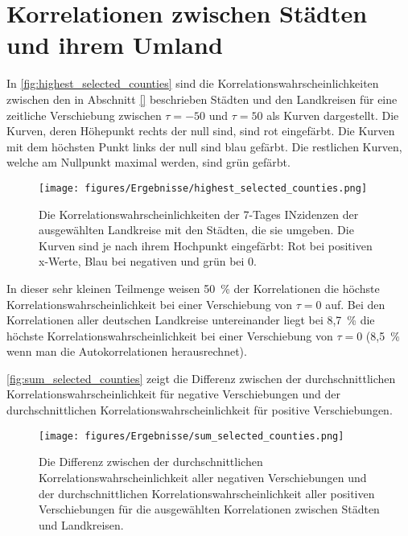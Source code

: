 \section{Korrelationen zwischen Städten und ihrem Umland}
In \autoref{fig:highest_selected_counties} sind die Korrelationswahrscheinlichkeiten zwischen den in Abschnitt \autoref{} beschrieben Städten und den Landkreisen für eine zeitliche Verschiebung zwischen $\tau=-50$ und $\tau=50$ als Kurven dargestellt.
Die Kurven, deren Höhepunkt rechts der null sind, sind rot eingefärbt. Die Kurven mit dem höchsten Punkt links der null sind blau gefärbt. Die restlichen Kurven, welche am Nullpunkt maximal werden, sind grün gefärbt.
\begin{figure}[H]
    \centering
    \texttt{[image: figures/Ergebnisse/highest\_selected\_counties.png]}
    \caption{Die Korrelationswahrscheinlichkeiten der 7-Tages INzidenzen der ausgewählten Landkreise mit den Städten, die sie umgeben. Die Kurven sind je nach ihrem Hochpunkt eingefärbt: Rot bei positiven x-Werte, Blau bei negativen und grün bei 0.}
    \label{fig:highest_selected_counties}
\end{figure}

In dieser sehr kleinen Teilmenge weisen 50~\% der Korrelationen die höchste Korrelationswahrscheinlichkeit bei einer Verschiebung von $\tau = 0$ auf.
Bei den Korrelationen aller deutschen Landkreise untereinander liegt bei 8,7~\% die höchste Korrelationswahrscheinlichkeit bei einer Verschiebung von $\tau= 0$ (8,5~\% wenn man die Autokorrelationen herausrechnet).

\autoref{fig:sum_selected_counties} zeigt die Differenz zwischen der durchschnittlichen Korrelationswahrscheinlichkeit für negative Verschiebungen und der durchschnittlichen Korrelationswahrscheinlichkeit für positive Verschiebungen.
\begin{figure}
    \centering
    \texttt{[image: figures/Ergebnisse/sum\_selected\_counties.png]}
    \caption{Die Differenz zwischen der durchschnittlichen Korrelationswahrscheinlichkeit aller negativen Verschiebungen und der durchschnittlichen Korrelationswahrscheinlichkeit aller positiven Verschiebungen für die ausgewählten Korrelationen zwischen Städten und Landkreisen.}
    \label{fig:sum_selected_counties}
\end{figure}